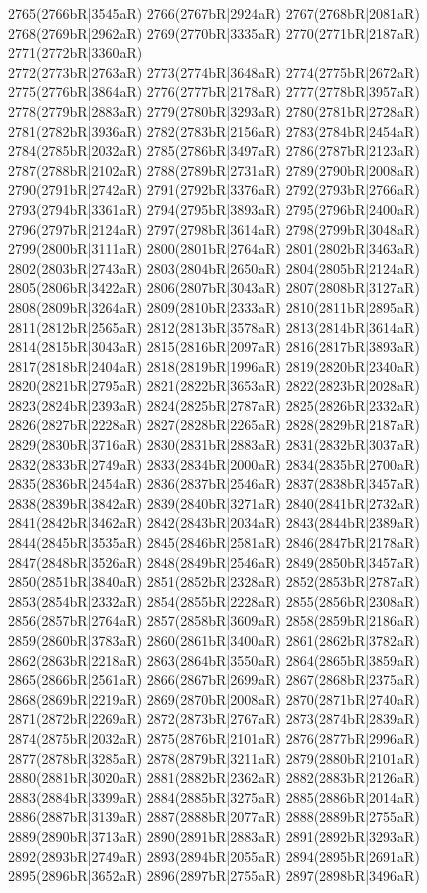 2765(2766bR|3545aR) 2766(2767bR|2924aR) 2767(2768bR|2081aR) 2768(2769bR|2962aR) 2769(2770bR|3335aR) 2770(2771bR|2187aR) 2771(2772bR|3360aR) \\2772(2773bR|2763aR) 2773(2774bR|3648aR) 2774(2775bR|2672aR) 2775(2776bR|3864aR) 2776(2777bR|2178aR) 2777(2778bR|3957aR) 2778(2779bR|2883aR) 2779(2780bR|3293aR) 2780(2781bR|2728aR) \\2781(2782bR|3936aR) 2782(2783bR|2156aR) 2783(2784bR|2454aR) 2784(2785bR|2032aR) 2785(2786bR|3497aR) 2786(2787bR|2123aR) 2787(2788bR|2102aR) 2788(2789bR|2731aR) 2789(2790bR|2008aR) \\2790(2791bR|2742aR) 2791(2792bR|3376aR) 2792(2793bR|2766aR) 2793(2794bR|3361aR) 2794(2795bR|3893aR) 2795(2796bR|2400aR) 2796(2797bR|2124aR) 2797(2798bR|3614aR) 2798(2799bR|3048aR) \\2799(2800bR|3111aR) 2800(2801bR|2764aR) 2801(2802bR|3463aR) 2802(2803bR|2743aR) 2803(2804bR|2650aR) 2804(2805bR|2124aR) 2805(2806bR|3422aR) 2806(2807bR|3043aR) 2807(2808bR|3127aR) \\2808(2809bR|3264aR) 2809(2810bR|2333aR) 2810(2811bR|2895aR) 2811(2812bR|2565aR) 2812(2813bR|3578aR) 2813(2814bR|3614aR) 2814(2815bR|3043aR) 2815(2816bR|2097aR) 2816(2817bR|3893aR) \\2817(2818bR|2404aR) 2818(2819bR|1996aR) 2819(2820bR|2340aR) 2820(2821bR|2795aR) 2821(2822bR|3653aR) 2822(2823bR|2028aR) 2823(2824bR|2393aR) 2824(2825bR|2787aR) 2825(2826bR|2332aR) \\2826(2827bR|2228aR) 2827(2828bR|2265aR) 2828(2829bR|2187aR) 2829(2830bR|3716aR) 2830(2831bR|2883aR) 2831(2832bR|3037aR) 2832(2833bR|2749aR) 2833(2834bR|2000aR) 2834(2835bR|2700aR) \\2835(2836bR|2454aR) 2836(2837bR|2546aR) 2837(2838bR|3457aR) 2838(2839bR|3842aR) 2839(2840bR|3271aR) 2840(2841bR|2732aR) 2841(2842bR|3462aR) 2842(2843bR|2034aR) 2843(2844bR|2389aR) \\2844(2845bR|3535aR) 2845(2846bR|2581aR) 2846(2847bR|2178aR) 2847(2848bR|3526aR) 2848(2849bR|2546aR) 2849(2850bR|3457aR) 2850(2851bR|3840aR) 2851(2852bR|2328aR) 2852(2853bR|2787aR) \\2853(2854bR|2332aR) 2854(2855bR|2228aR) 2855(2856bR|2308aR) 2856(2857bR|2764aR) 2857(2858bR|3609aR) 2858(2859bR|2186aR) 2859(2860bR|3783aR) 2860(2861bR|3400aR) 2861(2862bR|3782aR) \\2862(2863bR|2218aR) 2863(2864bR|3550aR) 2864(2865bR|3859aR) 2865(2866bR|2561aR) 2866(2867bR|2699aR) 2867(2868bR|2375aR) 2868(2869bR|2219aR) 2869(2870bR|2008aR) 2870(2871bR|2740aR) \\2871(2872bR|2269aR) 2872(2873bR|2767aR) 2873(2874bR|2839aR) 2874(2875bR|2032aR) 2875(2876bR|2101aR) 2876(2877bR|2996aR) 2877(2878bR|3285aR) 2878(2879bR|3211aR) 2879(2880bR|2101aR) \\2880(2881bR|3020aR) 2881(2882bR|2362aR) 2882(2883bR|2126aR) 2883(2884bR|3399aR) 2884(2885bR|3275aR) 2885(2886bR|2014aR) 2886(2887bR|3139aR) 2887(2888bR|2077aR) 2888(2889bR|2755aR) \\2889(2890bR|3713aR) 2890(2891bR|2883aR) 2891(2892bR|3293aR) 2892(2893bR|2749aR) 2893(2894bR|2055aR) 2894(2895bR|2691aR) 2895(2896bR|3652aR) 2896(2897bR|2755aR) 2897(2898bR|3496aR) 